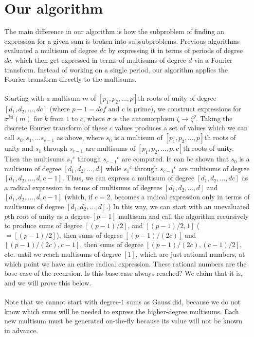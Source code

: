 \documentclass{article}
\begin{document}
\section{Our algorithm}
    The main difference in our algorithm is how the subproblem of finding an expression for a given sum is broken into subsubproblems. Previous algorithms evaluated a multisum of degree $ dc $ by expressing it in terms of periods of degree $ dc $, which then get expressed in terms of multisums of degree $ d $ via a Fourier transform. Instead of working on a single period, our algorithm applies the Fourier transform directly to the multisums.\\
    \\
    Starting with a multisum $ m $ of $ [p_1, p_2, ..., p] $th roots of unity of degree $ [d_1, d_2, ..., dc] $ (where $ p - 1 = dcf $ and $ c $ is prime), we construct expressions for $ \sigma^{kd}(m) $ for $ k $ from $ 1 $ to $ c $, where $ \sigma $ is the automorphism $ \zeta \rightarrow \zeta^g $. Taking the discrete Fourier transform of these $ c $ values produces a set of values which we can call $ s_0, s_1, \dots s_{c - 1} $ as above, where $ s_0 $ is a multisum of $ [p_1, p_2, ..., p] $th roots of unity and $ s_1 $ through $ s_{c - 1} $ are multisums of $ [p_1, p_2, ..., p, c] $th roots of unity. Then the multisums $ {s_1}^c $ through $ {s_{c - 1}}^c $ are computed. It can be shown that $ s_0 $ is a multisum of degree $ [d_1, d_2, ..., d] $ while $ {s_1}^c $ through $ {s_{c - 1}}^c $ are multisums of degree $ [d_1, d_2, ..., d, c - 1] $. Thus, we can express a multisum of degree $ [d_1, d_2, ..., dc] $ as a radical expression in terms of multisums of degrees $ [d_1, d_2, ..., d] $ and $ [d_1, d_2, ..., d, c - 1] $ (which, if $ c = 2 $, becomes a radical expression only in terms of multisums of degree $ [d_1, d_2, ..., d] $.) In this way, we can start with an unevaluated $ p $th root of unity as a degree-$ [p - 1] $ multisum and call the algorithm recursively to produce sums of degree $ [(p - 1)/2] $, and $ [(p - 1)/2, 1] $ ($ = [(p - 1)/2]$), then sums of degree $ [(p - 1)/(2c)] $ and $ [(p - 1)/(2c), c - 1] $, then sums of degree $ [(p - 1)/(2c), (c - 1)/2] $, etc. until we reach multisums of degree $ [1] $, which are just rational numbers, at which point we have an entire radical expression. These rational numbers are the base case of the recursion. Is this base case always reached? We claim that it is, and we will prove this below.\\
    \\
    Note that we cannot start with degree-$ 1 $ sums as Gauss did, because we do not know which sums will be needed to express the higher-degree multisums. Each new multisum must be generated on-the-fly because its value will not be known in advance.\\
\end{document}
